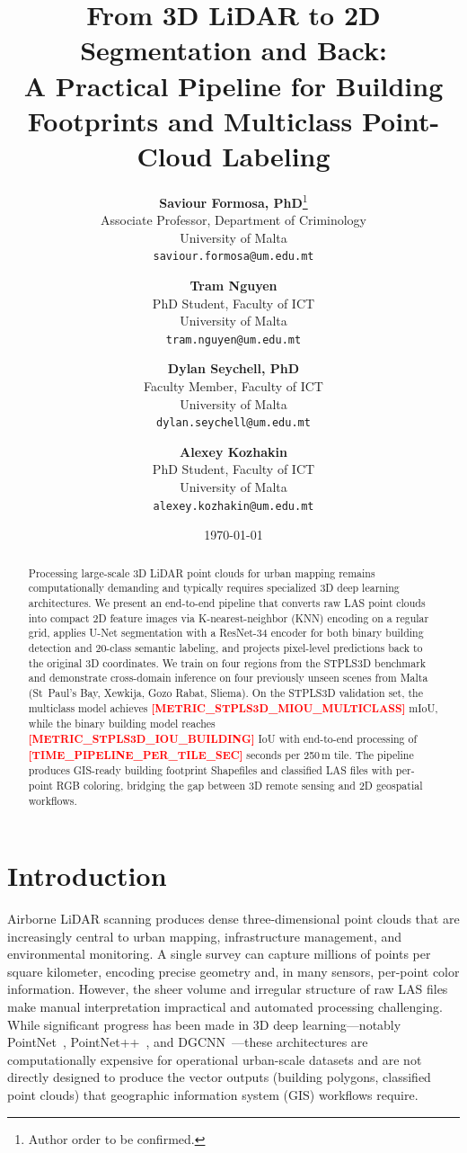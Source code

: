 \documentclass[11pt]{article}
\title{\textbf{From 3D LiDAR to 2D Segmentation and Back:\\ A Practical Pipeline for Building Footprints and Multiclass Point-Cloud Labeling}}
\author{
\textbf{Saviour Formosa, PhD}\thanks{Author order to be confirmed.}\\
Associate Professor, Department of Criminology\\
University of Malta\\
\texttt{saviour.formosa@um.edu.mt}
\and
\textbf{Tram Nguyen}\\
PhD Student, Faculty of ICT\\
University of Malta\\
\texttt{tram.nguyen@um.edu.mt}
\and
\textbf{Dylan Seychell, PhD}\\
Faculty Member, Faculty of ICT\\
University of Malta\\
\texttt{dylan.seychell@um.edu.mt}
\and
\textbf{Alexey Kozhakin}\\
PhD Student, Faculty of ICT\\
University of Malta\\
\texttt{alexey.kozhakin@um.edu.mt}
}
\date{\today}
\newcommand{\placeholder}[1]{\textcolor{red}{\textbf{[#1]}}}
\begin{document}
\maketitle

\begin{abstract}
Processing large-scale 3D LiDAR point clouds for urban mapping remains computationally demanding and typically requires specialized 3D deep learning architectures.
We present an end-to-end pipeline that converts raw LAS point clouds into compact 2D feature images via K-nearest-neighbor (KNN) encoding on a regular grid, applies U-Net segmentation with a ResNet-34 encoder for both binary building detection and 20-class semantic labeling, and projects pixel-level predictions back to the original 3D coordinates.
We train on four regions from the STPLS3D benchmark and demonstrate cross-domain inference on four previously unseen scenes from Malta (St~Paul's Bay, Xewkija, Gozo Rabat, Sliema).
On the STPLS3D validation set, the multiclass model achieves \placeholder{METRIC\_STPLS3D\_MIOU\_MULTICLASS} mIoU, while the binary building model reaches \placeholder{METRIC\_STPLS3D\_IOU\_BUILDING} IoU with end-to-end processing of \placeholder{TIME\_PIPELINE\_PER\_TILE\_SEC} seconds per 250\,m tile.
The pipeline produces GIS-ready building footprint Shapefiles and classified LAS files with per-point RGB coloring, bridging the gap between 3D remote sensing and 2D geospatial workflows.
\end{abstract}

\section{Introduction}
\label{sec:introduction}

Airborne LiDAR scanning produces dense three-dimensional point clouds that are increasingly central to urban mapping, infrastructure management, and environmental monitoring.
A single survey can capture millions of points per square kilometer, encoding precise geometry and, in many sensors, per-point color information.
However, the sheer volume and irregular structure of raw LAS files make manual interpretation impractical and automated processing challenging.
While significant progress has been made in 3D deep learning---notably PointNet~\cite{qi2017pointnet}, PointNet++~\cite{qi2017pointnetpp}, and DGCNN~\cite{wang2019dgcnn}---these architectures are computationally expensive for operational urban-scale datasets and are not directly designed to produce the vector outputs (building polygons, classified point clouds) that geographic information system (GIS) workflows require.
\end{document}
